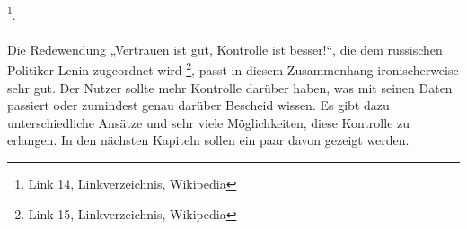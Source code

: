\footnote{Link 14, Linkverzeichnis, Wikipedia}.
\\
\\
Die Redewendung „Vertrauen ist gut, Kontrolle ist besser!“, die dem russischen Politiker Lenin zugeordnet wird
\footnote{Link 15, Linkverzeichnis, Wikipedia}, passt in diesem Zusammenhang ironischerweise sehr gut. Der Nutzer sollte mehr Kontrolle darüber haben, was mit seinen Daten passiert oder zumindest genau darüber Bescheid wissen. Es gibt dazu unterschiedliche Ansätze und sehr viele Möglichkeiten, diese Kontrolle zu erlangen. In den nächsten Kapiteln sollen ein paar davon gezeigt werden.

